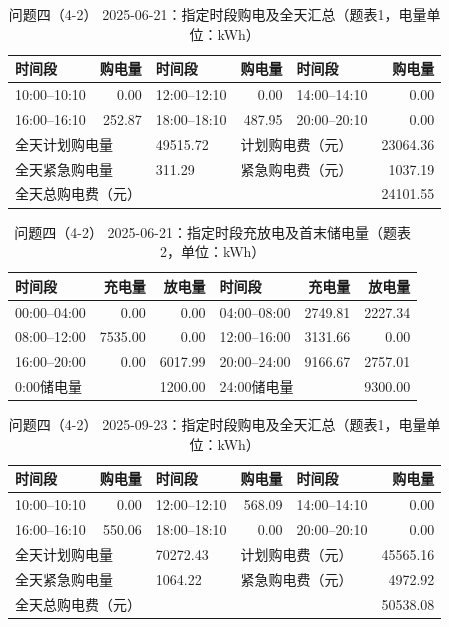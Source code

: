 \FloatBarrier
\begin{table}[H]
\centering\footnotesize
\setlength{\tabcolsep}{4pt}
\caption{问题四（4-2） 2025-06-21：指定时段购电及全天汇总（题表1，电量单位：kWh）}
\label{tab:required-q42-2025-06-21-grid}
\begin{tabular}{@{}lrlrlr@{}}
\toprule
时间段 & 购电量 & 时间段 & 购电量 & 时间段 & 购电量 \\
\midrule
10:00--10:10 & 0.00 & 12:00--12:10 & 0.00 & 14:00--14:10 & 0.00 \\
16:00--16:10 & 252.87 & 18:00--18:10 & 487.95 & 20:00--20:10 & 0.00 \\
\multicolumn{2}{l}{全天计划购电量} & 49515.72 & \multicolumn{2}{l}{计划购电费（元）} & 23064.36 \\
\multicolumn{2}{l}{全天紧急购电量} & 311.29 & \multicolumn{2}{l}{紧急购电费（元）} & 1037.19 \\
\multicolumn{5}{l}{全天总购电费（元）} & 24101.55 \\
\bottomrule
\end{tabular}
\end{table}

\begin{table}[H]
\centering\footnotesize
\setlength{\tabcolsep}{4pt}
\caption{问题四（4-2） 2025-06-21：指定时段充放电及首末储电量（题表2，单位：kWh）}
\label{tab:required-q42-2025-06-21-storage}
\begin{tabular}{@{}lrrlrr@{}}
\toprule
时间段 & 充电量 & 放电量 & 时间段 & 充电量 & 放电量 \\
\midrule
00:00--04:00 & 0.00 & 0.00 & 04:00--08:00 & 2749.81 & 2227.34 \\
08:00--12:00 & 7535.00 & 0.00 & 12:00--16:00 & 3131.66 & 0.00 \\
16:00--20:00 & 0.00 & 6017.99 & 20:00--24:00 & 9166.67 & 2757.01 \\
\multicolumn{2}{l}{0:00储电量} & 1200.00 & \multicolumn{2}{l}{24:00储电量} & 9300.00 \\
\bottomrule
\end{tabular}
\end{table}

\FloatBarrier
\begin{table}[H]
\centering\footnotesize
\setlength{\tabcolsep}{4pt}
\caption{问题四（4-2） 2025-09-23：指定时段购电及全天汇总（题表1，电量单位：kWh）}
\label{tab:required-q42-2025-09-23-grid}
\begin{tabular}{@{}lrlrlr@{}}
\toprule
时间段 & 购电量 & 时间段 & 购电量 & 时间段 & 购电量 \\
\midrule
10:00--10:10 & 0.00 & 12:00--12:10 & 568.09 & 14:00--14:10 & 0.00 \\
16:00--16:10 & 550.06 & 18:00--18:10 & 0.00 & 20:00--20:10 & 0.00 \\
\multicolumn{2}{l}{全天计划购电量} & 70272.43 & \multicolumn{2}{l}{计划购电费（元）} & 45565.16 \\
\multicolumn{2}{l}{全天紧急购电量} & 1064.22 & \multicolumn{2}{l}{紧急购电费（元）} & 4972.92 \\
\multicolumn{5}{l}{全天总购电费（元）} & 50538.08 \\
\bottomrule
\end{tabular}
\end{table}

